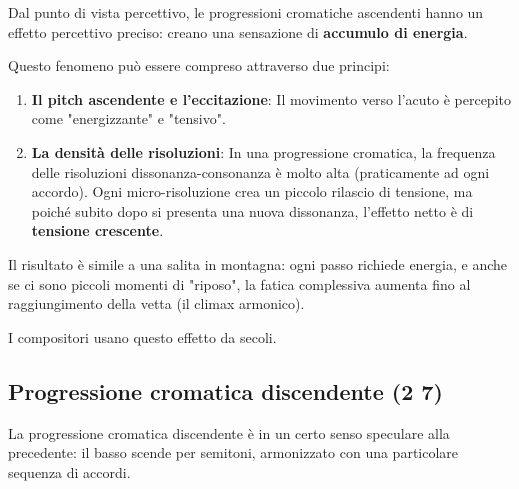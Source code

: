 \begin{fisica}
	Dal punto di vista percettivo, le progressioni cromatiche ascendenti hanno un effetto percettivo preciso: creano una sensazione di \textbf{accumulo di energia}.
	
	Questo fenomeno può essere compreso attraverso due principi:
	
	\begin{enumerate}
		\item \textbf{Il pitch ascendente e l'eccitazione}: Il movimento verso l'acuto è percepito come "energizzante" e "tensivo".
		
		\item \textbf{La densità delle risoluzioni}: In una progressione cromatica, la frequenza delle risoluzioni dissonanza-consonanza è molto alta (praticamente ad ogni accordo). Ogni micro-risoluzione crea un piccolo rilascio di tensione, ma poiché subito dopo si presenta una nuova dissonanza, l'effetto netto è di \textbf{tensione crescente}.
	\end{enumerate}
	
	Il risultato è simile a una salita in montagna: ogni passo richiede energia, e anche se ci sono piccoli momenti di "riposo", la fatica complessiva aumenta fino al raggiungimento della vetta (il climax armonico).
	
	I compositori usano questo effetto da secoli.
\end{fisica}

\subsection{Progressione cromatica discendente (2 7)}
\label{subsec:progressione_cromatica_discendente}

La progressione cromatica discendente è in un certo senso speculare alla precedente: il basso scende per semitoni, armonizzato con una particolare sequenza di accordi.

